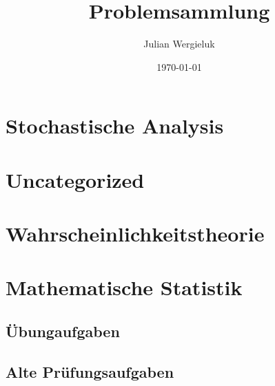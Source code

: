 \documentclass[11pt,oldfontcommands,twoside,a4paper]{memoir}
\title{Problemsammlung}\author{Julian Wergieluk}\date{\today}
\begin{document}
\frontmatter
\maketitle
\newpage
\tableofcontents

\mainmatter

\setcounter{secnumdepth}{4}
\renewcommand{\theenumi}{\Alph{enumi}.}
\renewcommand{\labelenumi}{\theenumi}


\chapter{Stochastische Analysis}



\chapter{Uncategorized}



\chapter{Wahrscheinlichkeitstheorie}



\chapter{Mathematische Statistik}

\section{Übungaufgaben}


\section{Alte Prüfungsaufgaben}









\backmatter



\end{document}
